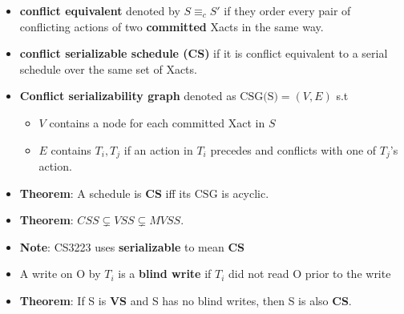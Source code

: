 \documentclass[8pt, landscape]{extarticle}
\begin{document}
\begin{multicols*}{4}
  \begin{itemize}
    \item \textbf{conflict equivalent} denoted by $S \equiv_c S'$ if they order every pair of conflicting actions of two \textbf{committed} Xacts in the same way.
    \item \textbf{conflict serializable schedule (CS)} if it is conflict equivalent to a serial schedule over the same set of Xacts.
    \item \textbf{Conflict serializability graph} denoted as $\text{CSG(S)} = (V, E)$ s.t
    \begin{itemize}
      \item $V$ contains a node for each committed Xact in $S$
      \item $E$ contains $T_i, T_j$ if an action in $T_i$ precedes and conflicts with one of $T_j$'s action.
    \end{itemize}
    \item \textbf{Theorem}: A schedule is \textbf{CS} iff its $\text{CSG}$ is acyclic.
    \item \textbf{Theorem}: $CSS \subsetneq VSS \subsetneq MVSS$.
    \item \textbf{Note}: CS3223 uses \textbf{serializable} to mean \textbf{CS}
    \item A write on O by $T_i$ is a \textbf{blind write} if $T_i$ did not read O prior to the write
    \item \textbf{Theorem}: If S is \textbf{VS} and S has no blind writes, then S is also \textbf{CS}.
  \end{itemize}


\end{multicols*}
\end{document}

